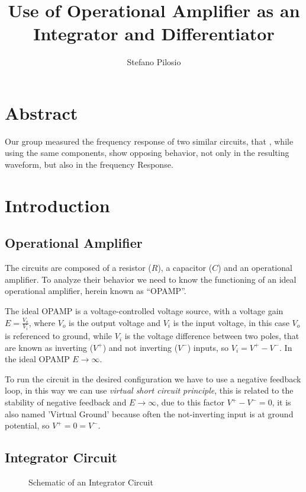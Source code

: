 \documentclass[a4paper,twocolumn]{article}
\begin{document}
\title{Use of Operational Amplifier as  an Integrator and Differentiator}
\author{{Stefano Pilosio}}

\maketitle

\section{Abstract}
Our group measured the frequency response of two similar circuits, that , while using the same components, show opposing behavior, not only in the resulting waveform, but also in the frequency Response.

\section{Introduction}

\subsection{Operational Amplifier} 

The circuits are composed of a resistor ($R$), a capacitor ($C$) and an operational amplifier. To analyze their behavior we need to know the functioning of an ideal operational amplifier, herein known as ``OPAMP''.

The ideal OPAMP is a voltage-controlled voltage source, with a voltage gain $E = \frac{V_o}{V_i}$, where $V_o$ is the output voltage and $V_i$ is the input voltage, in this case $V_o$ is referenced to ground, while $V_i$ is the voltage difference between two poles, that are known as inverting ($V^+$) and not inverting ($V^-$) inputs, so $V_i=V^+-V^-$. In the ideal OPAMP $E\to\infty$.

To run the circuit in the desired configuration we have to use a negative feedback loop, in this way we can use \emph{virtual short circuit principle}, this is related to the stability of negative feedback and $E\to\infty$, due to this factor $V^+-V^-=0$, it is also named 'Virtual Ground' because often the not-inverting input is at ground potential, so $V^+=0=V^-$.

\subsection{Integrator Circuit}

\begin{figure}
    \centering
    \def\svgwidht{\columnwidth}
    
    \label{fig:IntegrScheme}
    \caption{Schematic of an Integrator Circuit}
\end{figure}
\end{document}
